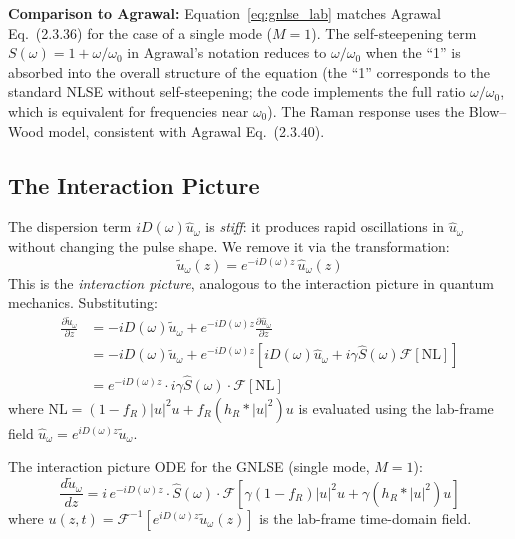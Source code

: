 \documentclass[12pt,a4paper]{article}
\newcommand{\pdv}[2]{\frac{\partial #1}{\partial #2}}
\newcommand{\dv}[2]{\frac{d #1}{d #2}}
\theoremstyle{definition}
\begin{document}
\begin{verified}
\textbf{Comparison to Agrawal:} Equation~\eqref{eq:gnlse_lab} matches Agrawal Eq.~(2.3.36) for the case of a single mode ($M=1$). The self-steepening term $S(\omega) = 1 + \omega/\omega_0$ in Agrawal's notation reduces to $\omega/\omega_0$ when the ``1'' is absorbed into the overall structure of the equation (the ``1'' corresponds to the standard NLSE without self-steepening; the code implements the full ratio $\omega/\omega_0$, which is equivalent for frequencies near $\omega_0$). The Raman response uses the Blow--Wood model, consistent with Agrawal Eq.~(2.3.40).
\end{verified}

\subsection{The Interaction Picture}
\label{sec:interaction_picture}

The dispersion term $iD(\omega)\hat{u}_\omega$ is \emph{stiff}: it produces rapid oscillations in $\hat{u}_\omega$ without changing the pulse shape. We remove it via the transformation:
\begin{equation}
\boxed{\tilde{u}_\omega(z) = e^{-iD(\omega)z}\,\hat{u}_\omega(z)}
\label{eq:interaction_picture}
\end{equation}
This is the \emph{interaction picture}, analogous to the interaction picture in quantum mechanics. Substituting:
\begin{align}
\pdv{\tilde{u}_\omega}{z} &= -iD(\omega)\tilde{u}_\omega + e^{-iD(\omega)z}\pdv{\hat{u}_\omega}{z} \nonumber\\
&= -iD(\omega)\tilde{u}_\omega + e^{-iD(\omega)z}\left[iD(\omega)\hat{u}_\omega + i\gamma\hat{S}(\omega)\mathcal{F}[\text{NL}]\right] \nonumber\\
&= e^{-iD(\omega)z}\cdot i\gamma\hat{S}(\omega)\cdot\mathcal{F}[\text{NL}]
\label{eq:ip_ode}
\end{align}
where $\text{NL} = (1-f_R)|u|^2 u + f_R(h_R*|u|^2)u$ is evaluated using the lab-frame field $\hat{u}_\omega = e^{iD(\omega)z}\tilde{u}_\omega$.

\begin{keyresult}
The interaction picture ODE for the GNLSE (single mode, $M=1$):
\begin{equation}
\boxed{\dv{\tilde{u}_\omega}{z} = i\,e^{-iD(\omega)z}\cdot\hat{S}(\omega)\cdot\mathcal{F}\!\left[\gamma(1-f_R)|u|^2 u + \gamma(h_R*|u|^2)u\right]}
\label{eq:forward_ode}
\end{equation}
where $u(z,t) = \mathcal{F}^{-1}[e^{iD(\omega)z}\tilde{u}_\omega(z)]$ is the lab-frame time-domain field.
\end{keyresult}
\end{document}
